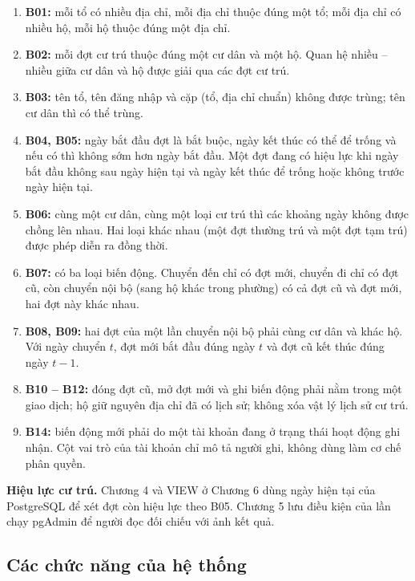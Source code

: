 \begin{enumerate}[leftmargin=*]
    \item \textbf{B01:} mỗi tổ có nhiều địa chỉ, mỗi địa chỉ thuộc đúng một tổ; mỗi địa chỉ có nhiều hộ, mỗi hộ thuộc đúng một địa chỉ.
    \item \textbf{B02:} mỗi đợt cư trú thuộc đúng một cư dân và một hộ. Quan hệ nhiều -- nhiều giữa cư dân và hộ được giải qua các đợt cư trú.
    \item \textbf{B03:} tên tổ, tên đăng nhập và cặp (tổ, địa chỉ chuẩn) không được trùng; tên cư dân thì có thể trùng.
    \item \textbf{B04, B05:} ngày bắt đầu đợt là bắt buộc, ngày kết thúc có thể để trống và nếu có thì không sớm hơn ngày bắt đầu. Một đợt đang có hiệu lực khi ngày bắt đầu không sau ngày hiện tại và ngày kết thúc để trống hoặc không trước ngày hiện tại.
    \item \textbf{B06:} cùng một cư dân, cùng một loại cư trú thì các khoảng ngày không được chồng lên nhau. Hai loại khác nhau (một đợt thường trú và một đợt tạm trú) được phép diễn ra đồng thời.
    \item \textbf{B07:} có ba loại biến động. Chuyển đến chỉ có đợt mới, chuyển đi chỉ có đợt cũ, còn chuyển nội bộ (sang hộ khác trong phường) có cả đợt cũ và đợt mới, hai đợt này khác nhau.
    \item \textbf{B08, B09:} hai đợt của một lần chuyển nội bộ phải cùng cư dân và khác hộ. Với ngày chuyển $t$, đợt mới bắt đầu đúng ngày $t$ và đợt cũ kết thúc đúng ngày $t - 1$.
    \item \textbf{B10 -- B12:} đóng đợt cũ, mở đợt mới và ghi biến động phải nằm trong một giao dịch; hộ giữ nguyên địa chỉ đã có lịch sử; không xóa vật lý lịch sử cư trú.
    \item \textbf{B14:} biến động mới phải do một tài khoản đang ở trạng thái hoạt động ghi nhận. Cột vai trò của tài khoản chỉ mô tả người ghi, không dùng làm cơ chế phân quyền.
\end{enumerate}

\textbf{Hiệu lực cư trú.} Chương 4 và VIEW ở Chương 6 dùng ngày hiện tại của PostgreSQL để xét đợt còn hiệu lực theo B05. Chương 5 lưu điều kiện của lần chạy pgAdmin để người đọc đối chiếu với ảnh kết quả.

\subsection{Các chức năng của hệ thống}
\label{subsec:chucnang}

